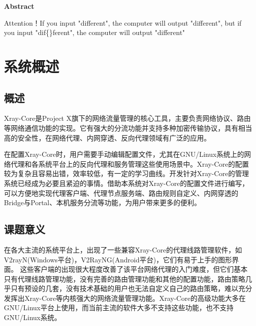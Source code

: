 \documentclass[12pt,a4paper]{article}%
\begin{document}
\begin{center}%
	{\textbf{Abstract}}%
\end{center}
\begin{adjustwidth}{1.06cm}{1.06cm}%
	\hspace{1.5em}Attention！If you input "dif{}ferent", the computer will output "different", but if you input "dif\{\}ferent", the computer will output "dif{}ferent"
\end{adjustwidth}

\newpage%

\tableofcontents
\newpage

\fancyfoot[C]{\thepage} %
\setcounter{page}{1} %

\section{系统概述}
\subsection{概述}

Xray-Core是Project X旗下的网络流量管理的核心工具，主要负责网络协议、路由等网络通信功能的实现。它有强大的分流功能并支持多种加密传输协议，具有相当高的安全性，在网络代理、内网穿透、反向代理领域有广泛的应用。

在配置Xray-Core时，用户需要手动编辑配置文件，尤其在GNU/Linux系统上的网络代理和各系统平台上的反向代理和服务管理这些使用场景中。Xray-Core的配置较为复杂且容易出错，效率较低，有一定的学习曲线。开发针对Xray-Core的管理系统已经成为必要且紧迫的事情。借助本系统对Xray-Core的配置文件进行编写，可以方便地实现代理客户端、代理节点服务端、路由规则自定义、内网穿透的Bridge与Portal、本机服务分流等功能，为用户带来更多的便利。

\subsection{课题意义}
在各大主流的系统平台上，出现了一些兼容Xray-Core的代理线路管理软件，如V2rayN(Windows平台)，V2RayNG(Android平台)，它们有易于上手的图形界面。 这些客户端的出现很大程度改善了该平台网络代理的入门难度，但它们基本只有代理线路管理功能，没有完善的路由管理功能和其他的配置功能，路由策略几乎只有预设的几套，没有技术基础的用户也无法自定义自己的路由策略，难以充分发挥出Xray-Core等内核强大的网络流量管理功能。Xray-Core的高级功能大多在GNU/Linux平台上使用，而当前主流的软件大多不支持这些功能，也不支持GNU/Linux系统。
\end{document}
